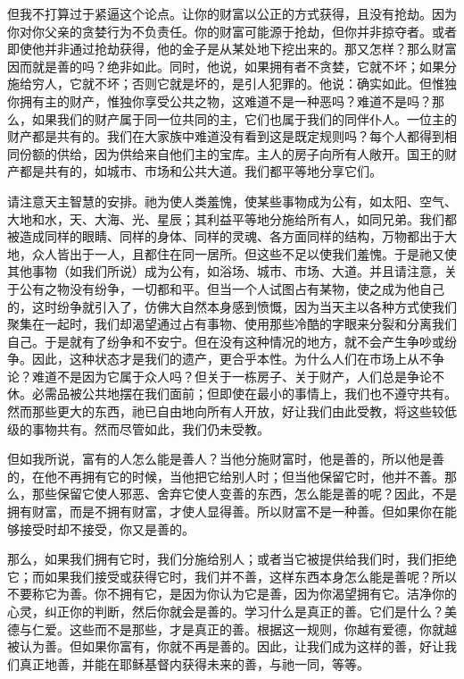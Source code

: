 但我不打算过于紧逼这个论点。让你的财富以公正的方式获得，且没有抢劫。因为你对你父亲的贪婪行为不负责任。你的财富可能源于抢劫，但你并非掠夺者。或者即使他并非通过抢劫获得，他的金子是从某处地下挖出来的。那又怎样？那么财富因而就是善的吗？绝非如此。同时，他说，如果拥有者不贪婪，它就不坏；如果分施给穷人，它就不坏；否则它就是坏的，是引人犯罪的。他说：确实如此。但惟独你拥有主的财产，惟独你享受公共之物，这难道不是一种恶吗？难道不是吗？那么，如果我们的财产属于同一位共同的主，它们也属于我们的同伴仆人。一位主的财产都是共有的。我们在大家族中难道没有看到这是既定规则吗？每个人都得到相同份额的供给，因为供给来自他们主的宝库。主人的房子向所有人敞开。国王的财产都是共有的，如城市、市场和公共大道。我们都平等地分享它们。\par

请注意天主智慧的安排。祂为使人类羞愧，使某些事物成为公有，如太阳、空气、大地和水，天、大海、光、星辰；其利益平等地分施给所有人，如同兄弟。我们都被造成同样的眼睛、同样的身体、同样的灵魂、各方面同样的结构，万物都出于大地，众人皆出于一人，且都住在同一居所。但这些不足以使我们羞愧。于是祂又使其他事物（如我们所说）成为公有，如浴场、城市、市场、大道。并且请注意，关于公有之物没有纷争，一切都和平。但当一个人试图占有某物，使之成为他自己的，这时纷争就引入了，仿佛大自然本身感到愤慨，因为当天主以各种方式使我们聚集在一起时，我们却渴望通过占有事物、使用那些冷酷的字眼来分裂和分离我们自己。于是就有了纷争和不安宁。但在没有这种情况的地方，就不会产生争吵或纷争。因此，这种状态才是我们的遗产，更合乎本性。为什么人们在市场上从不争论？难道不是因为它属于众人吗？但关于一栋房子、关于财产，人们总是争论不休。必需品被公共地摆在我们面前；但即使在最小的事情上，我们也不遵守共有。然而那些更大的东西，祂已自由地向所有人开放，好让我们由此受教，将这些较低级的事物共有。然而尽管如此，我们仍未受教。\par

但如我所说，富有的人怎么能是善人？当他分施财富时，他是善的，所以他是善的，在他不再拥有它的时候，当他把它给别人时；但当他保留它时，他并不善。那么，那些保留它使人邪恶、舍弃它使人变善的东西，怎么能是善的呢？因此，不是拥有财富，而是不拥有财富，才使人显得善。所以财富不是一种善。但如果你在能够接受时却不接受，你又是善的。\par

那么，如果我们拥有它时，我们分施给别人；或者当它被提供给我们时，我们拒绝它；而如果我们接受或获得它时，我们并不善，这样东西本身怎么能是善呢？所以不要称它为善。你不拥有它，是因为你认为它是善，因为你渴望拥有它。洁净你的心灵，纠正你的判断，然后你就会是善的。学习什么是真正的善。它们是什么？美德与仁爱。这些而不是那些，才是真正的善。根据这一规则，你越有爱德，你就越被认为善。但如果你富有，你就不再是善的。因此，让我们成为这样的善，好让我们真正地善，并能在耶稣基督内获得未来的善，与祂一同，等等。\par

